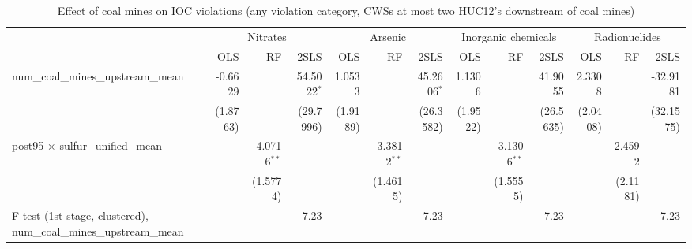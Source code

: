 
\begin{table}[htbp]
   
   \caption{\label{2sls_dwnstrm2step_minevio_allcat} Effect of coal mines on IOC violations (any violation category, CWSs at most two HUC12's downstream of coal mines)}
   \bigskip
   
   \centering
   
   \begin{adjustbox}{width = \textwidth, center}
      
      
      \begin{tabular}{lrrrrrrrrrrrr}
         \toprule
         
          & \multicolumn{3}{c}{Nitrates} & \multicolumn{3}{c}{Arsenic} & \multicolumn{3}{c}{Inorganic chemicals} & \multicolumn{3}{c}{Radionuclides}\\
         
                                                                             & OLS      & RF             & 2SLS          & OLS      & RF             & 2SLS          & OLS      & RF             & 2SLS      & OLS      & RF       & 2SLS\\  
         
         \midrule 
         num\_coal\_mines\_upstream\_mean                                    & -0.6629  &                & 54.5022$^{*}$ & 1.0533   &                & 45.2606$^{*}$ & 1.1306   &                & 41.9055   & 2.3308   &          & -32.9181\\   
                                                                             & (1.8763) &                & (29.7996)     & (1.9189) &                & (26.3582)     & (1.9522) &                & (26.5635) & (2.0408) &          & (32.1575)\\   
         post95 $\times$ sulfur\_unified\_mean                               &          & -4.0716$^{**}$ &               &          & -3.3812$^{**}$ &               &          & -3.1306$^{**}$ &           &          & 2.4592   &   \\   
                                                                             &          & (1.5774)       &               &          & (1.4615)       &               &          & (1.5555)       &           &          & (2.1181) &   \\   
         
         F-test (1st stage, clustered), num\_coal\_mines\_upstream\_mean     &          &                & 7.23          &          &                & 7.23          &          &                & 7.23      &          &          & 7.23\\  
         

\end{tabular}
\end{adjustbox}
\end{table}
